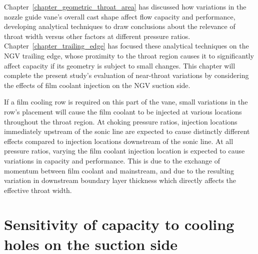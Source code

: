 \documentclass[a4paper, 11pt, oneside]{report}
\begin{document}

Chapter~\ref{chapter_geometric_throat_area} has discussed how variations in the nozzle guide vane's overall cast shape affect flow capacity and performance, developing analytical techniques to draw conclusions about the relevance of throat width versus other factors at different pressure ratios. Chapter~\ref{chapter_trailing_edge} has focused these analytical techniques on the NGV trailing edge, whose proximity to the throat region causes it to significantly affect capacity if its geometry is subject to small changes. This chapter will complete the present study's evaluation of near-throat variations by considering the effects of film coolant injection on the NGV suction side. 

If a film cooling row is required on this part of the vane, small variations in the row's placement will cause the film coolant to be injected at various locations throughout the throat region. At choking pressure ratios, injection locations immediately upstream of the sonic line are expected to cause distinctly different effects compared to injection locations downstream of the sonic line. At all pressure ratios, varying the film coolant injection location is expected to cause variations in capacity and performance. This is due to the exchange of momentum between film coolant and mainstream, and due to the resulting variation in downstream boundary layer thickness which directly affects the effective throat width.


\section{Sensitivity of capacity to cooling holes on the suction side}
\label{sensitivity_of_capacity_to_cooling_holes_on_the_leading_suction_side}

\end{document}
